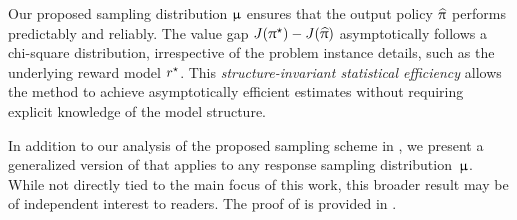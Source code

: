     Our proposed sampling distribution $\upmu$ ensures that the output policy $\widehat{\uppi}$ performs predictably and reliably. The value gap $J(\uppi^{\star}) - J(\widehat{\uppi})$ asymptotically follows a chi-square distribution, irrespective of the problem instance details, such as the underlying reward model $r^{\star}$. 
    This \emph{structure-invariant statistical efficiency} allows the method to achieve asymptotically efficient estimates without requiring explicit knowledge of the model structure. %


    In addition to our analysis of the proposed sampling scheme in , we present a generalized version of  that applies to any response sampling distribution~$\upmu$. While not directly tied to the main focus of this work, this broader result may be of independent interest to readers.
    The proof of  is provided in .
